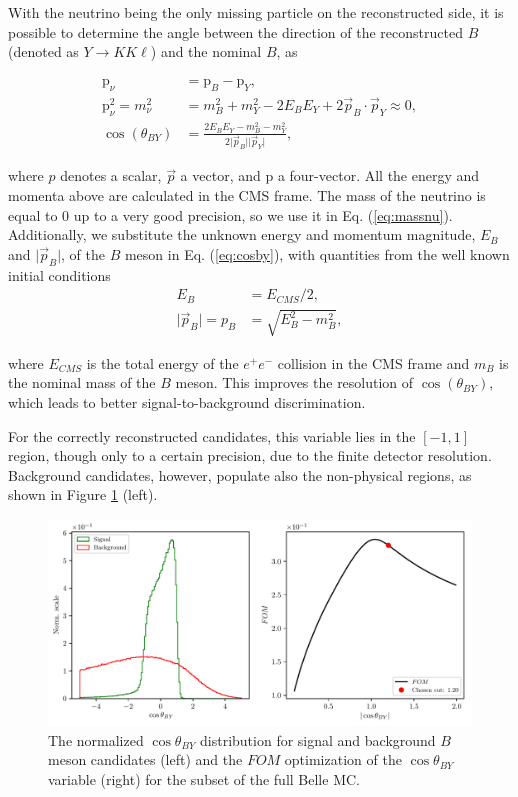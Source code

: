 With the neutrino being the only missing particle on the reconstructed side, it is possible to determine the angle between the direction of the reconstructed $B$ (denoted as $Y \to K K \ell$) and the nominal $B$, as

\begin{align}
\mathrm{p}_\nu &= \mathrm{p}_B - \mathrm{p}_{Y}, \\
\label{eq:massnu}
\mathrm{p}_\nu^2 = m_\nu^2 &= m_B^2 + m_Y^2 - 2E_BE_Y + 2\vec{p}_B \cdot \vec{p}_Y \approx 0, \\ 
\label{eq:cosby}
\cos \left(\theta_{BY}\right) &= \frac{2E_BE_Y - m_B^2 - m_Y^2}{2\vert \vec{p}_B \vert \vert \vec{p}_Y\vert},
\end{align} 

where $p$ denotes a scalar, $\vec{p}$ a vector, and $\mathrm{p}$ a four-vector. All the energy and momenta above are calculated in the CMS frame. The mass of the neutrino is equal to 0 up to a very good precision, so we use it in Eq. (\ref{eq:massnu}). Additionally, we substitute the unknown energy and momentum magnitude, $E_B$ and $\vert \vec{p}_B \vert$, of the $B$ meson in Eq. (\ref{eq:cosby}), with quantities from the well known initial conditions
\begin{align}
E_B &= E_{CMS} / 2,\\
\vert \vec{p}_B \vert = p_B &= \sqrt{E_B^2 - m_B^2},
\end{align} 

where $E_{CMS}$ is the total energy of the $e^+e^-$ collision in the CMS frame and $m_B$ is the nominal mass of the $B$ meson. This improves the resolution of $\cos \left(\theta_{BY}\right)$, which leads to better signal-to-background discrimination.

For the correctly reconstructed candidates, this variable lies in the $[-1,1]$ region, though only to a certain precision, due to the finite detector resolution. Background candidates, however, populate also the non-physical regions, as shown in Figure \ref{fig:cosby} (left). 

\begin{figure}[H]
	\centering
	\captionsetup{width=.8\linewidth}
	\includegraphics[width=\linewidth]{fig/cosBY}
	\caption{The normalized $\cos \theta_{BY}$ distribution for signal and background $B$ meson candidates (left) and the $FOM$ optimization of the $\cos \theta_{BY}$ variable (right) for the subset of the full Belle MC.}
	\label{fig:cosby}
\end{figure}


